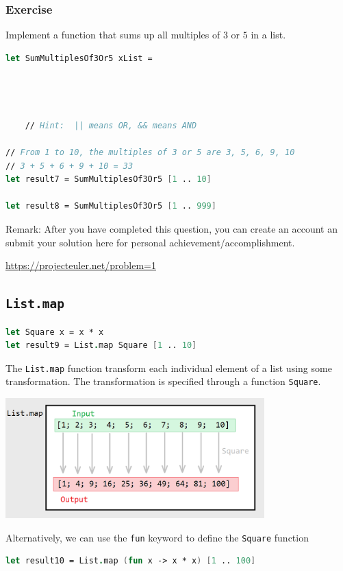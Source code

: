 \documentclass[12pt]{article}
\begin{document}
\subsubsection*{Exercise}
Implement a function that sums up all multiples of $3$ or $5$ in a list.

\begin{lstlisting}[language=FSharp]
let SumMultiplesOf3Or5 xList =




    // Hint:  || means OR, && means AND

// From 1 to 10, the multiples of 3 or 5 are 3, 5, 6, 9, 10
// 3 + 5 + 6 + 9 + 10 = 33
let result7 = SumMultiplesOf3Or5 [1 .. 10]

let result8 = SumMultiplesOf3Or5 [1 .. 999]
\end{lstlisting}

Remark: After you have completed this question, you can create an account an submit your solution here for personal achievement/accomplishment.

\url{https://projecteuler.net/problem=1}

\pagebreak

\subsection{\texttt{List.map}}

\begin{lstlisting}[language=FSharp]
let Square x = x * x
let result9 = List.map Square [1 .. 10]
\end{lstlisting}
The \texttt{List.map} function transform each individual element of a list using some transformation. The transformation is specified through a function \texttt{Square}.
\begin{center}
\includegraphics[width=10cm]{pictures/picture28.png}
\end{center}   
Alternatively, we can use the \texttt{fun} keyword to define the \texttt{Square} function
\begin{lstlisting}[language=FSharp]
let result10 = List.map (fun x -> x * x) [1 .. 100]
\end{lstlisting}
\end{document}
